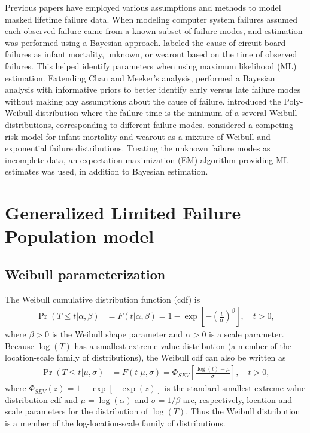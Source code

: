 \documentclass[aap]{imsart}
\begin{document}
Previous papers have employed various assumptions and methods to model masked lifetime failure data.  When modeling computer system failures \citet{reiser} assumed each observed failure came from a known subset of failure modes, and estimation was performed using a Bayesian approach.  \cite{chan} labeled the cause of circuit board failures as infant mortality, unknown, or wearout based on the time of observed failures.  This helped identify parameters when using maximum likelihood (ML) estimation.  Extending Chan and Meeker's analysis, \citet{basu} performed a Bayesian analysis with informative priors to better identify early versus late failure modes without making any assumptions about the cause of failure.  \cite{berger} introduced the Poly-Weibull distribution where the failure time is the minimum of a several Weibull distributions, corresponding to different failure modes.  \cite{ranjan} considered a competing risk model for infant mortality and wearout as a mixture of Weibull and exponential failure distributions.  Treating the unknown failure modes as incomplete data, an expectation maximization (EM) algorithm providing ML estimates was used, in addition to Bayesian estimation.


\section{Generalized Limited Failure Population model}
\label{sec:GLFP model}

\subsection{Weibull parameterization}
\label{sec:Weibull parameterization}
The Weibull cumulative
 distribution function (cdf) is
\begin{align}
\label{equation:weibull.cdf}
\Pr(T \leq t|\alpha,\beta ) &= F(t|\alpha,\beta)=1-
\exp \left [-\left (\frac{t}{\alpha} \right )^{\beta}
\right ], \quad t > 0,
\end{align}
where $\beta>0$ is the Weibull shape parameter and $\alpha>0$ is a
scale parameter. Because $\log(T)$ has a smallest extreme value
distribution (a member of the location-scale family of
distributions), the Weibull cdf can also be written as
\begin{align*}
\Pr(T \leq t| \mu,\sigma ) &= F(t| \mu,\sigma)= \Phi_{SEV}\left[\frac{\log(t)-\mu}{\sigma}\right], \quad t > 0,
\end{align*}
where $\Phi_{SEV}(z)=1-\exp[-\exp(z)]$ is the standard smallest extreme value
distribution cdf and
$\mu=\log(\alpha)$ and $\sigma=1/\beta$ are, respectively, location
and scale parameters for the distribution of $\log(T)$. Thus the Weibull
distribution is a member of the log-location-scale family of
distributions.
\end{document}
